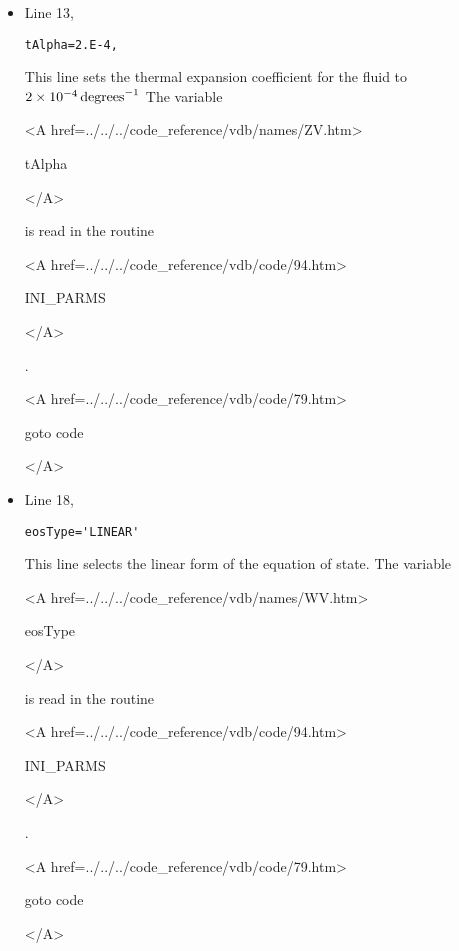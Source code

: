 \begin{itemize}
\item Line 13,
\begin{verbatim}
tAlpha=2.E-4,
\end{verbatim}
This line sets the thermal expansion coefficient for the fluid
to $2 \times 10^{-4}\,{\rm degrees}^{-1}$
The variable
{\bf
\begin{rawhtml} <A href=../../../code_reference/vdb/names/ZV.htm> \end{rawhtml}
tAlpha 
\begin{rawhtml} </A>\end{rawhtml}
}
is read in the routine
{\it
\begin{rawhtml} <A href=../../../code_reference/vdb/code/94.htm> \end{rawhtml}
INI\_PARMS
\begin{rawhtml} </A>\end{rawhtml}
}.

{\bf
\begin{rawhtml} <A href=../../../code_reference/vdb/code/79.htm> \end{rawhtml}
goto code
\begin{rawhtml} </A>\end{rawhtml}
}

\item Line 18,
\begin{verbatim}
eosType='LINEAR'
\end{verbatim}
This line selects the linear form of the equation of state.
The variable
{\bf
\begin{rawhtml} <A href=../../../code_reference/vdb/names/WV.htm> \end{rawhtml}
eosType
\begin{rawhtml} </A>\end{rawhtml}
}
is read in the routine
{\it
\begin{rawhtml} <A href=../../../code_reference/vdb/code/94.htm> \end{rawhtml}
INI\_PARMS
\begin{rawhtml} </A>\end{rawhtml}
}.

{\bf
\begin{rawhtml} <A href=../../../code_reference/vdb/code/79.htm> \end{rawhtml}
goto code
\begin{rawhtml} </A>\end{rawhtml}
}




\end{itemize}
